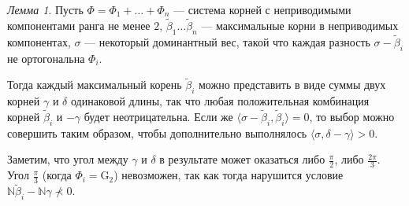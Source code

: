 \documentclass[10pt]{article}
\theoremstyle{remark}
\newtheorem{lm}{Лемма}
\newcommand{\N}{\mathbb{N}}
\begin{document}
\begin{lm}\label{maxrootsum}
Пусть $\Phi=\Phi_1+\ldots+\Phi_n$ --- система корней с неприводимыми компонентами ранга не менее $2$, $\widetilde\beta_1 \ldots \widetilde\beta_n$ ---  максимальные корни в неприводимых компонентах, $\sigma$ --- некоторый доминантный вес, такой что каждая разность $\sigma-\widetilde\beta_i$ не ортогональна $\Phi_i$.

Тогда каждый максимальный корень $\widetilde\beta_i$ можно представить в виде суммы двух корней $\gamma$ и $\delta$ одинаковой длины, так что любая положительная комбинация корней $\widetilde\beta_i$ и $-\gamma$ будет неотрицательна. Если же $\langle\sigma-\widetilde\beta_i,\widetilde\beta_i\rangle=0$, то выбор можно совершить таким образом, чтобы дополнительно выполнялось $\langle\sigma,\delta-\gamma\rangle>0$.

Заметим, что угол между $\gamma$ и $\delta$ в результате может оказаться либо $\frac{\pi}{2}$, либо $\frac{2\pi}{3}$. Угол $\frac{\pi}{3}$ (когда $\Phi_i = \mathrm{G}_2$) невозможен, так как тогда нарушится условие $\N\widetilde\beta_i-\N\gamma \nprec 0$.
\end{lm}
\end{document}
